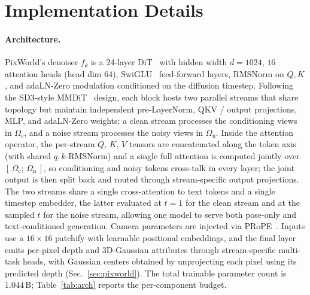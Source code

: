 \section{Implementation Details}
\label{sec:appendix_settings}

\paragraph{Architecture.}
PixWorld's denoiser $f_\theta$ is a 24-layer DiT~\citep{peebles2023scalable} with hidden width $d{=}1024$, $16$ attention heads (head dim $64$), SwiGLU~\citep{shazeer2020glu} feed-forward layers, RMSNorm on $Q,K$, and adaLN-Zero modulation conditioned on the diffusion timestep. Following the SD3-style MMDiT~\citep{esser2024scaling} design, each block hosts two parallel streams that share topology but maintain independent pre-LayerNorm, QKV / output projections, MLP, and adaLN-Zero weights: a clean stream processes the conditioning views in $\Omega_{\mathrm c}$, and a noise stream processes the noisy views in $\Omega_{\mathrm n}$. Inside the attention operator, the per-stream $Q$, $K$, $V$ tensors are concatenated along the token axis (with shared $q,k$-RMSNorm) and a single full attention is computed jointly over $[\,\Omega_{\mathrm c};\,\Omega_{\mathrm n}\,]$, so conditioning and noisy tokens cross-talk in every layer; the joint output is then split back and routed through stream-specific output projections. The two streams share a single cross-attention to text tokens and a single timestep embedder, the latter evaluated at $t{=}1$ for the clean stream and at the sampled $t$ for the noise stream, allowing one model to serve both pose-only and text-conditioned generation. Camera parameters are injected via PRoPE~\citep{li2025cameras}. Inputs use a $16{\times}16$ patchify with learnable positional embeddings, and the final layer emits per-pixel depth and 3D-Gaussian attributes through stream-specific multi-task heads, with Gaussian centers obtained by unprojecting each pixel using its predicted depth (Sec.~\ref{sec:pixworld}). The total trainable parameter count is $1.044$\,B; Table~\ref{tab:arch} reports the per-component budget.

